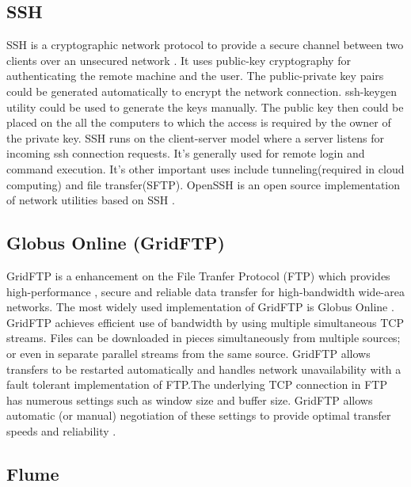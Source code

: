 {     \pv
     
\subsection{SSH}

     SSH is a cryptographic network protocol to
     provide a secure channel between two clients over an unsecured
     network \cite{www-ssh-wiki}. It uses public-key cryptography for
     authenticating the
     remote machine and the user. The public-private key pairs could
     be generated automatically to encrypt the network connection.
     ssh-keygen utility could be used to generate the keys manually.
     The public key then could be placed on the all the computers to
     which the access is required by the owner of the private key.
     SSH runs on the client-server model where a server listens for
     incoming ssh connection requests. It's generally used for remote
     login and command execution. It's other important uses include
     tunneling(required in cloud computing) and file transfer(SFTP).
     OpenSSH is an open source implementation of network utilities
     based on SSH \cite{www-openssh-wiki}.

     \pv

\subsection{Globus Online (GridFTP)}

     GridFTP is a enhancement on the File Tranfer Protocol (FTP) which
     provides high-performance , secure and reliable data transfer for
     high-bandwidth wide-area networks. The most widely used implementation of
     GridFTP is Globus Online \cite{www-GlobusOnline}. GridFTP achieves
     efficient use of
     bandwidth by using multiple simultaneous TCP streams.  Files can
     be downloaded in pieces simultaneously from multiple sources; or
     even in separate parallel streams from the same source. GridFTP
     allows transfers to be restarted automatically and handles
     network unavailability with a fault tolerant implementation of
     FTP.The underlying TCP connection in FTP has numerous settings
     such as window size and buffer size. GridFTP allows automatic (or
     manual) negotiation of these settings to provide optimal transfer
     speeds and reliability .

     \pv


\subsection{Flume}

}
